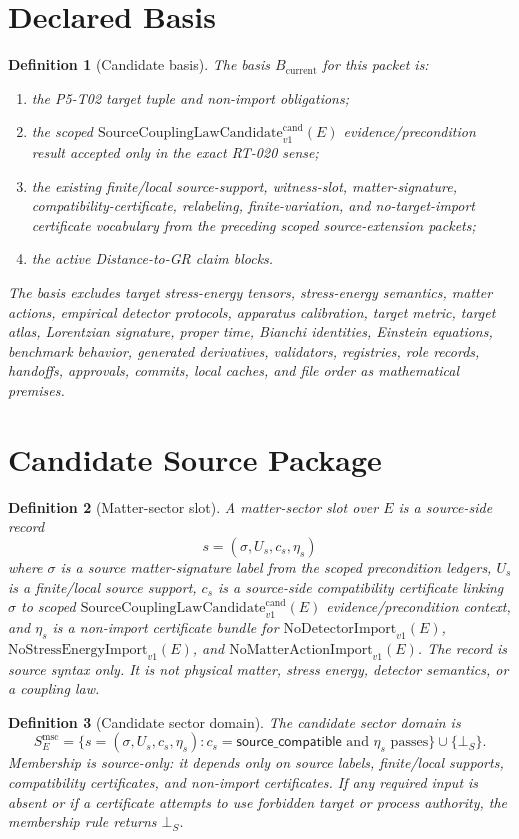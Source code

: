 \documentclass[11pt]{article}
\newcommand{\SCLC}{\mathrm{SourceCouplingLawCandidate}^{\mathrm{cand}}_{v1}}
\newcommand{\Bcur}{B_{\mathrm{current}}}
\newcommand{\NoSE}{\mathrm{NoStressEnergyImport}_{v1}}
\newcommand{\NoAction}{\mathrm{NoMatterActionImport}_{v1}}
\newcommand{\NoDetector}{\mathrm{NoDetectorImport}_{v1}}
\newcommand{\BottomS}{\bot_S}
\newtheorem{definition}{Definition}
\begin{document}
\section{Declared Basis}

\begin{definition}[Candidate basis]
The basis \(\Bcur\) for this packet is:
\begin{enumerate}[leftmargin=*]
\item the P5-T02 target tuple and non-import obligations;
\item the scoped \(\SCLC(E)\) evidence/precondition result accepted only in
  the exact RT-020 sense;
\item the existing finite/local source-support, witness-slot,
  matter-signature, compatibility-certificate, relabeling, finite-variation,
  and no-target-import certificate vocabulary from the preceding scoped
  source-extension packets;
\item the active Distance-to-GR claim blocks.
\end{enumerate}
The basis excludes target stress-energy tensors, stress-energy semantics,
matter actions, empirical detector protocols, apparatus calibration, target
metric, target atlas, Lorentzian signature, proper time, Bianchi identities,
Einstein equations, benchmark behavior, generated derivatives, validators,
registries, role records, handoffs, approvals, commits, local caches, and file
order as mathematical premises.
\end{definition}

\section{Candidate Source Package}

\begin{definition}[Matter-sector slot]
A matter-sector slot over \(E\) is a source-side record
\[
  s=(\sigma,U_s,c_s,\eta_s)
\]
where \(\sigma\) is a source matter-signature label from the scoped
precondition ledgers, \(U_s\) is a finite/local source support, \(c_s\) is a
source-side compatibility certificate linking \(\sigma\) to scoped
\(\SCLC(E)\) evidence/precondition context, and \(\eta_s\) is a non-import
certificate bundle for \(\NoDetector(E)\), \(\NoSE(E)\), and
\(\NoAction(E)\). The record is source syntax only. It is not physical matter,
stress energy, detector semantics, or a coupling law.
\end{definition}

\begin{definition}[Candidate sector domain]
The candidate sector domain is
\[
  S_E^{\mathrm{msc}}
  =
  \{s=(\sigma,U_s,c_s,\eta_s): c_s=\mathsf{source\_compatible}
  \text{ and } \eta_s \text{ passes}\}\cup\{\BottomS\}.
\]
Membership is source-only: it depends only on source labels, finite/local
supports, compatibility certificates, and non-import certificates. If any
required input is absent or if a certificate attempts to use forbidden target
or process authority, the membership rule returns \(\BottomS\).
\end{definition}
\end{document}
